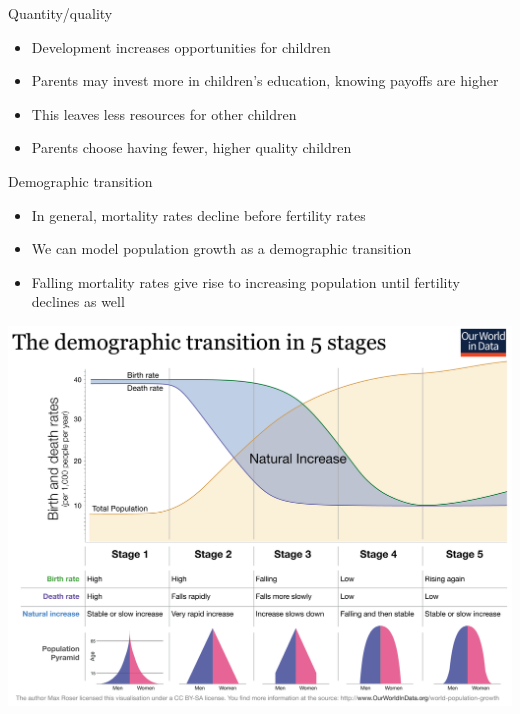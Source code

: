 \documentclass[10pt]{beamer}
\begin{document}
\begin{frame}[label={sec:orgc47f778}]{}
\alert{Quantity/quality}
\begin{itemize}
\item Development increases opportunities for children
\item Parents may invest more in children's education, knowing payoffs are higher
\item This leaves less resources for other children
\item Parents choose having fewer, higher quality children
\end{itemize}
\end{frame}

\begin{frame}[label={sec:org6aa8698}]{}
\alert{Demographic transition}
\begin{itemize}
\item In general, mortality rates decline before fertility rates
\item We can model population growth as a \alert{demographic transition}
\item Falling mortality rates give rise to increasing population until fertility declines as well
\end{itemize}
\end{frame}

\begin{frame}[label={sec:org7a267de}]{}
\begin{center}
\includegraphics[width=.75\textwidth]{./img/Demographic-Transition.png}
\end{center}
\end{frame}
\end{document}
